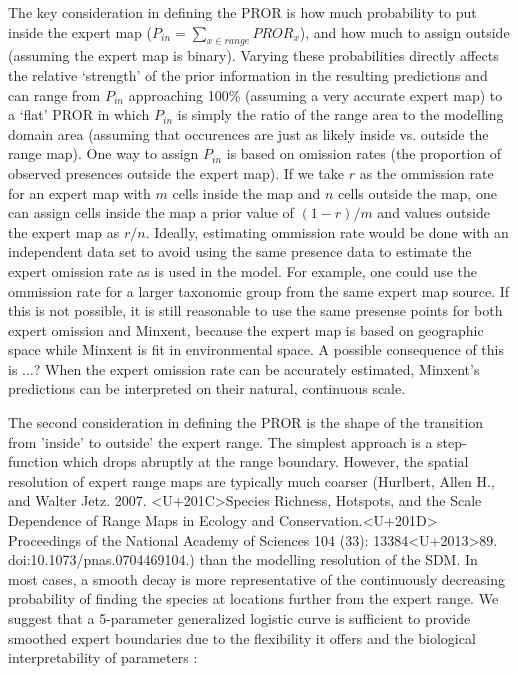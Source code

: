 The key consideration in defining the PROR is how much probability to put inside the expert map ($P_{in}=\sum\nolimits_{x \in range} PROR_x$), and how much to assign outside (assuming the expert map is binary). Varying these probabilities directly affects the relative `strength' of the prior information in the resulting predictions and can range from $P_{in}$ approaching 100\%  (assuming a very accurate expert map) to a `flat' PROR in which $P_{in}$ is simply the ratio of the range area to the modelling domain area (assuming that occurences are just as likely inside vs. outside the range map).  
One way to assign $P_{in}$ is based on omission rates (the proportion of observed presences outside the expert map). If we take $r$ as the ommission rate for an expert map with $m$ cells inside the map and $n$ cells outside the map, one can assign cells inside the map a prior value of $(1-r)/m$ and values outside the expert map as $r/n$. Ideally, estimating ommission rate would be done with an independent data set to avoid using the same presence data to estimate the expert omission rate as is used in the model. For example, one could use the ommission rate for a larger taxonomic group from the same expert map source. If this is not possible, it is still reasonable to use the same presense points for both expert omission and Minxent, because the expert map is based on geographic space while Minxent is fit in environmental space. A possible consequence of this is ...? When the expert omission rate can be accurately estimated, Minxent's predictions can be interpreted on their natural, continuous scale.  


The second consideration in defining the PROR is the shape of the transition from 'inside' to outside' the expert range.  The simplest approach is a step-function which drops abruptly at the range boundary.  However, the spatial resolution of expert range maps are typically much coarser (Hurlbert, Allen H., and Walter Jetz. 2007. <U+201C>Species Richness, Hotspots, and the Scale Dependence of Range Maps in Ecology and Conservation.<U+201D> Proceedings of the National Academy of Sciences 104 (33): 13384<U+2013>89. doi:10.1073/pnas.0704469104.) than the modelling resolution of the SDM. In most cases, a smooth decay is more representative of the continuously decreasing probability of finding the species at locations further from the expert range.  We suggest that a 5-parameter generalized logistic curve is sufficient to provide smoothed expert boundaries due to the flexibility it offers and the biological interpretability of parameters \cite{RICHARDS_1959}:


